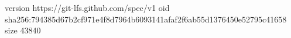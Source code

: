 version https://git-lfs.github.com/spec/v1
oid sha256:794385d67b2cf971e4f8d7964b6093141afaf2f6ab55d1376450e52795c41658
size 43840

